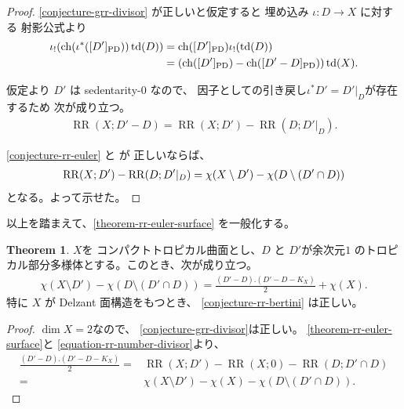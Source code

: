 \documentclass[a4paper,dvipdfmx,reqno,12pt]{amsart}
\theoremstyle{definition}
\newtheorem{theorem}{Theorem}[section]
\newcommand{\opn}[1]{\operatorname{#1}}
\newcommand{\PD}[1]{[#1]_{\mathrm{PD}}}
\numberwithin{equation}{section}
\begin{document}
\begin{proof}
\cref{conjecture-grr-divisor} が正しいと仮定すると
埋め込み $\iota\colon D\to X$ に対する
射影公式より
\begin{align}
\iota_!(\opn{ch}(\iota^{*}(\PD{D'}))\opn{td}(D))
&=\opn{ch}(\PD{D'})\iota_!(\opn{td}(D)) \notag \\
&=(\opn{ch}(\PD{D'})-\opn{ch}(\PD{D'-D}))\opn{td}(X).
\end{align}

仮定より $D'$ は sedentarity-$0$ なので、
因子としての引き戻し$\iota^{*}D'=D'|_{D}$が存在するため
次が成り立つ。
\begin{align}
\label{equation-rr-number-divisor}
\opn{RR}(X;D'-D)=\opn{RR}(X;D')-
\opn{RR}(D;D'|_{D}).
\end{align}

\cref{conjecture-rr-euler} と
\cite[Conjecture 6.13]{demedrano2023chern} が
正しいならば、
\begin{align}
\opn{RR}(X;D')-
\opn{RR}(D;D'|_{D})=
\chi(X\setminus D')-\chi(D\setminus (D'\cap D)) \notag
\end{align}
となる。よって示せた。
\end{proof}

以上を踏まえて、\cref{theorem-rr-euler-surface}
を一般化する。

\begin{theorem}
\label{theorem-rr-bertini-surface}
$X$を
コンパクトトロピカル曲面とし、$D$ と $D'$が余次元$1$
のトロピカル部分多様体とする。このとき、次が成り立つ。
\begin{align}
\chi(X\setminus D')-\chi(D\setminus (D'\cap D))
=\frac{(D'-D).(D'-D-K_X)}{2}+\chi(X).
\end{align}
特に $X$ が Delzant 面構造をもつとき、
\cref{conjecture-rr-bertini} は正しい。
\end{theorem}

\begin{proof}
$\dim X=2$なので、
\cref{conjecture-grr-divisor}は正しい。
\cref{theorem-rr-euler-surface}と
\eqref{equation-rr-number-divisor}より、
\begin{align}
\frac{(D'-D).(D'-D-K_X)}{2}=&
\opn{RR}(X;D')-\opn{RR}(X;0)-
\opn{RR}(D;D'\cap D) \\
=&\chi(X\setminus D')-\chi(X)-\chi(D\setminus (D'\cap D)).
\end{align}
\end{proof}
\end{document}
